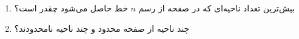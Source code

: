 \EXERCISE
\begin{enumerate}
\item
بیش‌ترین تعداد ناحیه‌ای که در صفحه از رسم
$n$
خط حاصل می‌شود چقدر است؟
\item
چند ناحیه از صفحه محدود و چند ناحیه نامحدودند؟
\end{enumerate}